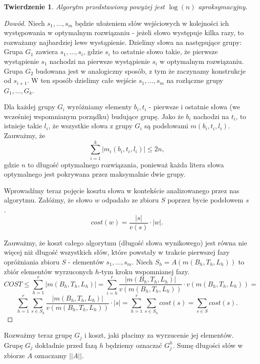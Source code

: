 \documentclass[12pt]{article}
\theoremstyle{plain}
\newtheorem*{tw}{Twierdzenie}
\begin{document}
\begin{tw}
Algorytm przedstawiony powyżej jest $\log(n)$ aproksymacyjny.
\end{tw}
\begin{proof} [Dowód]
Niech $s_1, \dots, s_m$ będzie ułożeniem słów wejściowych w kolejności ich występowania w optymalnym rozwiązaniu - jeżeli słowo występuje kilka razy, to rozważamy najbardziej lewe wystąpienie. Dzielimy słowa na następujące grupy:
\newline
Grupa $G_1$ zawiera $s_1, \dots, s_i$, gdzie $s_i$ to ostatnie słowo takie, że pierwsze wystąpienie $s_1$ nachodzi na pierwsze wystąpienie $s_i$ w optymalnym rozwiązaniu.
\newline
Grupa $G_2$ budowana jest w analogiczny sposób, z tym że zaczynamy konstrukcje od $s_{i+1}$. W ten sposób dzielimy całe wejście $s_1, \dots, s_m$ na rozłączne grupy $G_1, \dots, G_k$.

Dla każdej grupy $G_i$ wyróżniamy elementy $b_i, t_i$ - pierwsze i ostatnie słowa (we wcześniej wspomnianym porządku) budujące grupę. Jako że $b_i$ nachodzi na $t_i$, to istnieje takie $l_i$, że wszystkie słowa z grupy $G_i$ są podsłowami $m(b_i, t_i, l_i)$.
Zauważmy, że 
$$\sum_{i=1}^{k} |m_i(b_i, t_i, l_i)| \leq 2n,$$
gdzie $n$ to długość optymalnego rozwiązania, ponieważ każda litera słowa optymalnego jest pokrywana przez maksymalnie dwie grupy.

Wprowadźmy teraz pojęcie kosztu słowa w kontekście analizowanego przez nas algorytmu. Załóżmy, że słowo $w$ odpadało ze zbioru $S$ poprzez bycie podsłowem $s$. 
$$cost(w) = \frac{|s|}{v(s)} \cdot |w|.$$

Zauważmy, że koszt całego algorytmu (długość słowa wynikowego) jest równa nie więcej niż długość wszystkich słów, które powstały w trakcie pierwszej fazy opróżniania zbioru $S$ - elementów $s_1, \dots, s_m$. Niech $S_h = A(m(B_h, T_h, L_h))$ to zbiór elementów wyrzuconych $h$-tym kroku wspomnianej fazy. 
$$COST \leq \sum_{h=1}^{r} |m(B_h, T_h, L_h)| = \sum_{i=h}^{r} \frac{|m(B_h, T_h, L_h)|}{v(m(B_h, T_h, L_h))} \cdot v(m(B_h, T_h, L_h))= $$
$$\sum_{h=1}^{r} \sum_{s \in S_h} \frac{|m(B_h, T_h, L_h)|}{v(m(B_h, T_h, L_h))} \cdot |s| = \sum_{h=1}^{r} \sum_{s \in S_h} cost(s) = \sum_{s \in S} cost(s).$$
\end{proof}

Rozważmy teraz grupę $G_j$ i koszt, jaki płacimy za wyrzucenie jej elementów. Grupę $G_j$ dokładnie przed fazą $h$ będziemy oznaczać $G_j^{h}$.
Sumę długości słów w zbiorze $A$ oznaczamy $||A||$.
 
\end{document}
